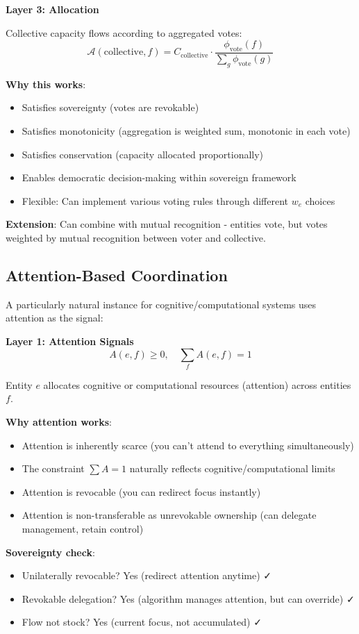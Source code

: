 \documentclass[11pt,a4paper]{article}
\theoremstyle{definition}
\theoremstyle{remark}
\newcommand{\A}{\mathcal{A}}
\begin{document}
\textbf{Layer 3: Allocation}

Collective capacity flows according to aggregated votes:
\[ \A(\text{collective}, f) = C_{\text{collective}} \cdot \frac{\phi_{\text{vote}}(f)}{\sum_g \phi_{\text{vote}}(g)} \]

\textbf{Why this works}:
\begin{itemize}
\item Satisfies sovereignty (votes are revokable)
\item Satisfies monotonicity (aggregation is weighted sum, monotonic in each vote)
\item Satisfies conservation (capacity allocated proportionally)
\item Enables democratic decision-making within sovereign framework
\item Flexible: Can implement various voting rules through different $w_e$ choices
\end{itemize}

\textbf{Extension}: Can combine with mutual recognition - entities vote, but votes weighted by mutual recognition between voter and collective.

\subsection{Attention-Based Coordination}

A particularly natural instance for cognitive/computational systems uses attention as the signal:

\textbf{Layer 1: Attention Signals}
\[ A(e,f) \ge 0, \quad \sum_f A(e,f) = 1 \]

Entity $e$ allocates cognitive or computational resources (attention) across entities $f$.

\textbf{Why attention works}:
\begin{itemize}
\item Attention is inherently scarce (you can't attend to everything simultaneously)
\item The constraint $\sum A = 1$ naturally reflects cognitive/computational limits
\item Attention is revocable (you can redirect focus instantly)
\item Attention is non-transferable as unrevokable ownership (can delegate management, retain control)
\end{itemize}

\textbf{Sovereignty check}:
\begin{itemize}
\item Unilaterally revocable? Yes (redirect attention anytime) ✓
\item Revokable delegation? Yes (algorithm manages attention, but can override) ✓
\item Flow not stock? Yes (current focus, not accumulated) ✓
\end{itemize}
\end{document}
